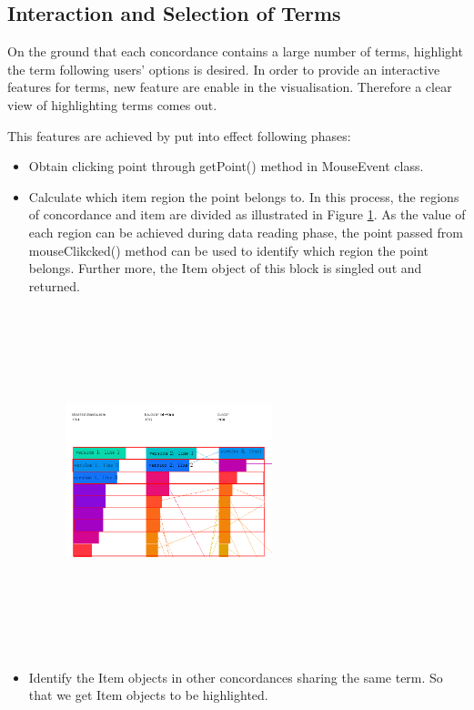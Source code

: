 \subsection{Interaction and Selection of Terms}

On the ground that each concordance contains a large number of terms, highlight the term following users' options is desired. In order to provide an interactive features for terms, new feature are enable in the visualisation. Therefore a clear view of highlighting terms comes out. 

This features are achieved by put into effect following phases:
\begin{itemize}
	\item \textbf{} Obtain clicking point through getPoint() method in MouseEvent class.
	\item \textbf{} Calculate which item region the point belongs to. In this process, the regions of concordance and item are divided as illustrated in Figure \ref{fig:regionDivide}. As the value of each region can be achieved during data reading phase, the point passed from mouseClikcked() method can be used to identify which region the point belongs. Further more, the Item object of this block is singled out and returned.
	\begin{figure}[H]
		\centering	
		\includegraphics[width=6cm, height=10cm]{Figs/Region-Divide}\\[1ex]
		\caption{}
		\label{fig:regionDivide}
	\end{figure} 
	\item \textbf{} Identify the Item objects in other concordances sharing the same term. So that we get Item objects to be highlighted.

\end{itemize}
